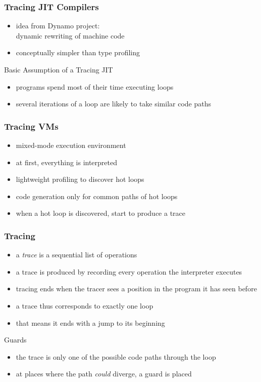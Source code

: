 \documentclass[utf8x]{beamer}
\begin{document}
\begin{frame}
    \frametitle{Tracing JIT Compilers}
    \begin{itemize}
    \item idea from Dynamo project: \\
    dynamic rewriting of machine code
    \item conceptually simpler than type profiling
    \end{itemize}
    \pause
    \begin{block}{Basic Assumption of a Tracing JIT}
        \begin{itemize}
        \item programs spend most of their time executing loops
        \item several iterations of a loop are likely to take similar code paths
        \end{itemize}
    \end{block}
\end{frame}

\begin{frame}
    \frametitle{Tracing VMs}
    \begin{itemize}
    \item mixed-mode execution environment
    \item at first, everything is interpreted
    \item lightweight profiling to discover hot loops
    \item code generation only for common paths of hot loops
    \item when a hot loop is discovered, start to produce a trace
    \end{itemize}
\end{frame}

\begin{frame}
    \frametitle{Tracing}
    \begin{itemize}
    \item a \emph{trace} is a sequential list of operations
    \item a trace is produced by recording every operation the interpreter executes
    \item tracing ends when the tracer sees a position in the program it has seen before
    \item a trace thus corresponds to exactly one loop
    \item that means it ends with a jump to its beginning
    \end{itemize}
    \pause
    \begin{block}{Guards}
        \begin{itemize}
        \item the trace is only one of the possible code paths through the loop
        \item at places where the path \emph{could} diverge, a guard is placed
        \end{itemize}
    \end{block}
\end{frame}
\end{document}
